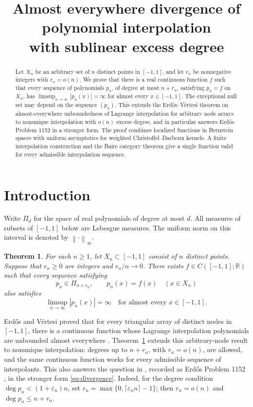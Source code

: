 \documentclass[11pt]{article}
\title{Almost everywhere divergence of polynomial interpolation\\
with sublinear excess degree}
\author{}
\date{}
\newtheorem{theorem}{Theorem}
\theoremstyle{definition}
\numberwithin{equation}{section}
\newcommand{\R}{\mathbb R}
\newcommand{\norm}[1]{\left\lVert #1\right\rVert}
\begin{document}
\maketitle

\begin{abstract}
Let \(X_n\) be an arbitrary set of \(n\) distinct points in \([-1,1]\),
and let \(r_n\) be nonnegative integers with \(r_n=o(n)\).
We prove that there is a real continuous function \(f\) such that every
sequence of polynomials \(p_n\), of degree at most \(n+r_n\), satisfying
\(p_n=f\) on \(X_n\), has
\(\limsup_{n\to\infty}|p_n(x)|=\infty\) for almost every \(x\in[-1,1]\).
The exceptional null set may depend on the sequence \((p_n)\).
This extends the Erd\H{o}s--V\'ertesi theorem on almost-everywhere
unboundedness of Lagrange interpolation for arbitrary node arrays to
nonunique interpolation with \(o(n)\) excess degree, and in particular
answers Erd\H{o}s Problem 1152 in a stronger form. The proof combines
localized functions in Bernstein spaces with uniform asymptotics for
weighted Christoffel--Darboux kernels. A finite interpolation construction
and the Baire category theorem give a single function valid for every
admissible interpolation sequence.
\end{abstract}

\section{Introduction}

Write \(\Pi_d\) for the space of real polynomials of degree at most \(d\).
All measures of subsets of \([-1,1]\) below are Lebesgue measures.
The uniform norm on this interval is denoted by \(\norm{\cdot}_\infty\).

\begin{theorem}\label{thm:main}
For each \(n\ge1\), let \(X_n\subset[-1,1]\) consist of \(n\) distinct
points. Suppose that \(r_n\ge0\) are integers and \(r_n/n\to0\).
There exists \(f\in C([-1,1];\R)\) such that every sequence satisfying
\[
 p_n\in\Pi_{n+r_n},
 \qquad p_n(x)=f(x)\quad(x\in X_n)
\]
also satisfies
\begin{equation}\label{eq:divergence}
 \limsup_{n\to\infty}|p_n(x)|=\infty
 \quad\text{for almost every }x\in[-1,1].
\end{equation}
\end{theorem}

Erd\H{o}s and V\'ertesi proved that for every triangular array of
distinct nodes in \([-1,1]\), there is a continuous function whose
Lagrange interpolation polynomials are unbounded almost everywhere
\cite{EV80,EV81}. Theorem~\ref{thm:main} extends this arbitrary-node
result to nonunique interpolation: degrees up to \(n+r_n\), with
\(r_n=o(n)\), are allowed, and the same continuous function works for
every admissible sequence of interpolants. This also answers the question
in \cite[Problem~2.42]{Favorite99}, recorded as Erd\H{o}s Problem 1152
\cite{Erdos1152}, in the stronger form \eqref{eq:divergence}.
Indeed, for the degree condition \(\deg p_n<(1+\varepsilon_n)n\),
set \(r_n=\max\{0,\lceil\varepsilon_n n\rceil-1\}\); then
\(r_n=o(n)\) and \(\deg p_n\le n+r_n\).
\end{document}

